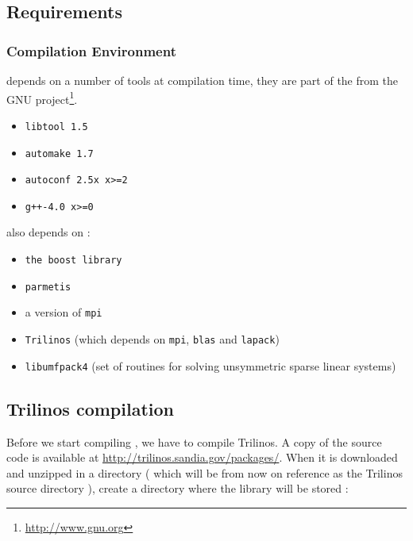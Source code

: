 \subsection{Requirements}

\subsubsection{Compilation Environment}
\label{sec:comp-envir}

\lifev depends on a number of tools at compilation time, they are part
of the  from the GNU project\footnote{\url{http://www.gnu.org}}.

\begin{itemize}
\item \verb!libtool 1.5!
\item \verb!automake 1.7!
\item \verb!autoconf 2.5x x>=2!
\item \verb!g++-4.0 x>=0!
\end{itemize}

\lifev also depends on :

\begin{itemize}
\item \verb!the boost library!
\item \verb!parmetis!
\item a version of \verb!mpi!
\item \verb!Trilinos! (which depends on \verb!mpi!, \verb!blas! and \verb!lapack!)
\item \verb!libumfpack4! (set of routines for solving unsymmetric sparse linear systems)
\end{itemize}





\subsection{Trilinos compilation}
Before we start compiling \lifev, we have to compile Trilinos. A copy of the source
code is available at \url{http://trilinos.sandia.gov/packages/}. When it is
downloaded and unzipped in a directory ( which will be from now on reference as the Trilinos
source directory ), create a directory where the library will be stored :

